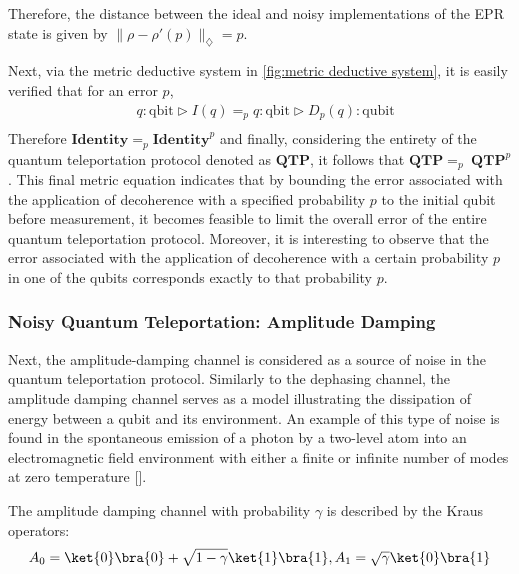 Therefore, the distance between the ideal and noisy implementations of the EPR state is given by $\lVert \rho-\rho'(p) \rVert_{\diamondsuit} = p$.

Next, via the metric deductive system in \autoref{fig:metric deductive system}, it is easily verified that for an error $p$,
\begin{equation}
\begin{split}
    &q: \text{qbit}  \triangleright  I (q) =_{p} q: \text{qbit} \triangleright D_{p} (q)  : \text{qubit} \\    
\end{split}
\end{equation}
Therefore $\textbf{Identity} =_{p} \textbf{Identity}^{p}$ and finally, considering the entirety of the quantum teleportation protocol denoted as $\textbf{QTP}$, it follows that $\textbf{QTP} =_{p} \hspace{3pt}\textbf{QTP}^{p}$. This final metric equation indicates that by bounding the error associated with the application of decoherence with a specified probability $p$ to the initial qubit before measurement, it becomes feasible to limit the overall error of the entire quantum teleportation protocol. Moreover, it is interesting to observe that the error associated with the application of decoherence with a certain probability $p$ in one of the qubits corresponds exactly to that probability $p$.

\subsubsection{Noisy Quantum Teleportation: Amplitude Damping}
Next, the amplitude-damping channel is considered as a source of noise in the quantum teleportation protocol. Similarly to the dephasing channel, the amplitude damping channel serves as a model illustrating the dissipation of energy between a qubit and its environment. An example of this type of noise is found in the spontaneous emission of a photon by a two-level atom into an electromagnetic field environment with either a finite or infinite number of modes at zero temperature [\cite{salles2008experimental, Wang_2011}].


The amplitude damping channel with probability $\gamma$ is described by the Kraus operators:
\begin{equation}
     A_{0}= \ket{0} \bra{0} + \sqrt{1-\gamma} \ket{1} \bra{1} ,  A_{1}= \sqrt{\gamma} \ket{0} \bra{1}
\end{equation}

